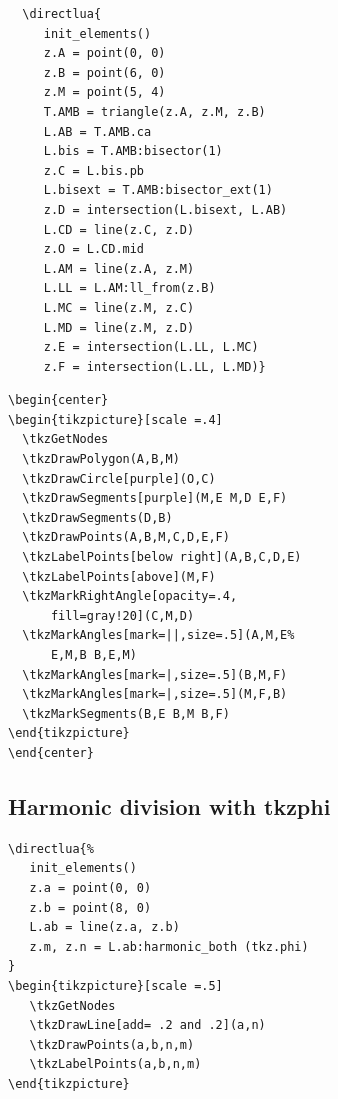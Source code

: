 \begin{minipage}{.5\textwidth}
  \begin{verbatim}
  \directlua{
     init_elements()
     z.A = point(0, 0)
     z.B = point(6, 0)
     z.M = point(5, 4)
     T.AMB = triangle(z.A, z.M, z.B)
     L.AB = T.AMB.ca
     L.bis = T.AMB:bisector(1)
     z.C = L.bis.pb
     L.bisext = T.AMB:bisector_ext(1)
     z.D = intersection(L.bisext, L.AB)
     L.CD = line(z.C, z.D)
     z.O = L.CD.mid
     L.AM = line(z.A, z.M)
     L.LL = L.AM:ll_from(z.B)
     L.MC = line(z.M, z.C)
     L.MD = line(z.M, z.D)
     z.E = intersection(L.LL, L.MC)
     z.F = intersection(L.LL, L.MD)}
  \end{verbatim}
\end{minipage}
\begin{minipage}{.5\textwidth}
\begin{verbatim}
\begin{center}
\begin{tikzpicture}[scale =.4]
  \tkzGetNodes
  \tkzDrawPolygon(A,B,M)
  \tkzDrawCircle[purple](O,C)
  \tkzDrawSegments[purple](M,E M,D E,F)
  \tkzDrawSegments(D,B)
  \tkzDrawPoints(A,B,M,C,D,E,F)
  \tkzLabelPoints[below right](A,B,C,D,E)
  \tkzLabelPoints[above](M,F)
  \tkzMarkRightAngle[opacity=.4,
      fill=gray!20](C,M,D)
  \tkzMarkAngles[mark=||,size=.5](A,M,E%
      E,M,B B,E,M)
  \tkzMarkAngles[mark=|,size=.5](B,M,F)
  \tkzMarkAngles[mark=|,size=.5](M,F,B)
  \tkzMarkSegments(B,E B,M B,F)
\end{tikzpicture}
\end{center}
\end{verbatim}
\end{minipage}

\subsection{Harmonic division with tkzphi }
\label{sub:harmonic_division_with_tkzphi}

\begin{Verbatim}
\directlua{%
   init_elements()
   z.a = point(0, 0)
   z.b = point(8, 0)
   L.ab = line(z.a, z.b)
   z.m, z.n = L.ab:harmonic_both (tkz.phi)
}
\begin{tikzpicture}[scale =.5]
   \tkzGetNodes
   \tkzDrawLine[add= .2 and .2](a,n)
   \tkzDrawPoints(a,b,n,m)
   \tkzLabelPoints(a,b,n,m)
\end{tikzpicture}
\end{Verbatim}



